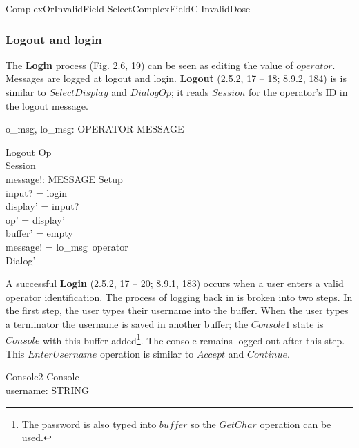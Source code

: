 \begin{zed}
ComplexOrInvalidField  SelectComplexFieldC \lor InvalidDose
\end{zed}

\subsubsection{Logout and login} \label{sect:login-console}

The {\bf Login} process (Fig. 2.6, 19) can be seen as editing the
value of $operator$.  Messages are logged at logout and login.  
{\bf Logout} (2.5.2, 17 -- 18; 8.9.2, 184) is is similar to $SelectDisplay$
and $DialogOp$; it reads $Session$ for the operator's ID in the logout
message. 

\begin{axdef}
	o\_msg, lo\_msg: OPERATOR \fun MESSAGE
\end{axdef}

\begin{schema}{Logout}
	Op \\
	\Xi Session \\
	message!: MESSAGE
\where
	Setup \\
	input? = login \\
	display' = input? \\
	op' =  display' \\
	buffer' = empty \\
	message! = lo\_msg~operator \\
	Dialog' 
\end{schema}
A successful {\bf Login} (2.5.2, 17 -- 20; 8.9.1, 183) occurs when a
user enters a valid operator identification.  The process of logging
back in is broken into two steps.  In the first step, the user types
their username into the buffer.  When the user types a terminator the
username is saved in another buffer; the $Console1$ state is $Console$
with this buffer added\footnote{The password is also typed into
$buffer$ so the $GetChar$ operation can be used.}. The console remains
logged out after this step.  This $EnterUsername$ operation is similar
to $Accept$ and $Continue$.

\begin{schema}{Console2}
	Console \\
	username: STRING
\end{schema}

